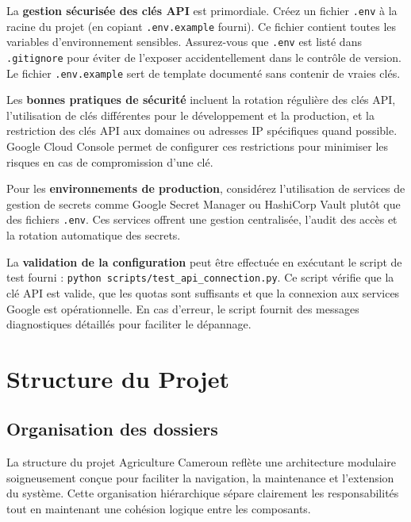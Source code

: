 La \textbf{gestion sécurisée des clés API} est primordiale. Créez un fichier \texttt{.env} à la racine du projet (en copiant \texttt{.env.example} fourni). Ce fichier contient toutes les variables d'environnement sensibles. Assurez-vous que \texttt{.env} est listé dans \texttt{.gitignore} pour éviter de l'exposer accidentellement dans le contrôle de version. Le fichier \texttt{.env.example} sert de template documenté sans contenir de vraies clés.

Les \textbf{bonnes pratiques de sécurité} incluent la rotation régulière des clés API, l'utilisation de clés différentes pour le développement et la production, et la restriction des clés API aux domaines ou adresses IP spécifiques quand possible. Google Cloud Console permet de configurer ces restrictions pour minimiser les risques en cas de compromission d'une clé.

Pour les \textbf{environnements de production}, considérez l'utilisation de services de gestion de secrets comme Google Secret Manager ou HashiCorp Vault plutôt que des fichiers \texttt{.env}. Ces services offrent une gestion centralisée, l'audit des accès et la rotation automatique des secrets.

La \textbf{validation de la configuration} peut être effectuée en exécutant le script de test fourni : \texttt{python scripts/test\_api\_connection.py}. Ce script vérifie que la clé API est valide, que les quotas sont suffisants et que la connexion aux services Google est opérationnelle. En cas d'erreur, le script fournit des messages diagnostiques détaillés pour faciliter le dépannage.

\section{Structure du Projet}

\subsection{Organisation des dossiers}

La structure du projet Agriculture Cameroun reflète une architecture modulaire soigneusement conçue pour faciliter la navigation, la maintenance et l'extension du système. Cette organisation hiérarchique sépare clairement les responsabilités tout en maintenant une cohésion logique entre les composants.

